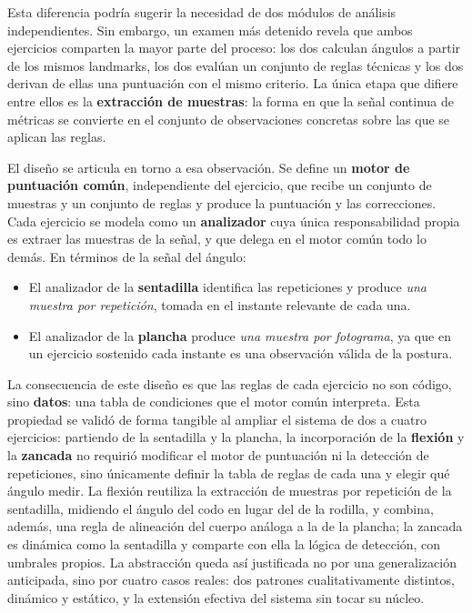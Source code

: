 \documentclass[12pt,a4paper,twoside,openright]{book}
\begin{document}
    Esta diferencia podría sugerir la necesidad de dos módulos de análisis
    independientes. Sin embargo, un examen más detenido revela que ambos
    ejercicios comparten la mayor parte del proceso: los dos calculan ángulos a
    partir de los mismos landmarks, los dos evalúan un conjunto de reglas
    técnicas y los dos derivan de ellas una puntuación con el mismo criterio. La
    única etapa que difiere entre ellos es la \textbf{extracción de muestras}: la
    forma en que la señal continua de métricas se convierte en el conjunto de
    observaciones concretas sobre las que se aplican las reglas.

    El diseño se articula en torno a esa observación. Se define un
    \textbf{motor de puntuación común}, independiente del ejercicio, que recibe
    un conjunto de muestras y un conjunto de reglas y produce la puntuación y las
    correcciones. Cada ejercicio se modela como un \textbf{analizador} cuya única
    responsabilidad propia es extraer las muestras de la señal, y que delega en
    el motor común todo lo demás. En términos de la señal del ángulo:

    \begin{itemize}
        \item El analizador de la \textbf{sentadilla} identifica las
        repeticiones y produce \textit{una muestra por repetición}, tomada en el
        instante relevante de cada una.
        \item El analizador de la \textbf{plancha} produce \textit{una muestra
        por fotograma}, ya que en un ejercicio sostenido cada instante es una
        observación válida de la postura.
    \end{itemize}

    La consecuencia de este diseño es que las reglas de cada ejercicio no son
    código, sino \textbf{datos}: una tabla de condiciones que el motor común
    interpreta. Esta propiedad se validó de forma tangible al ampliar el sistema
    de dos a cuatro ejercicios: partiendo de la sentadilla y la plancha, la
    incorporación de la \textbf{flexión} y la \textbf{zancada} no requirió
    modificar el motor de puntuación ni la detección de repeticiones, sino
    únicamente definir la tabla de reglas de cada una y elegir qué ángulo medir.
    La flexión reutiliza la extracción de muestras por repetición de la
    sentadilla, midiendo el ángulo del codo en lugar del de la rodilla, y
    combina, además, una regla de alineación del cuerpo análoga a la de la
    plancha; la zancada es dinámica como la sentadilla y comparte con ella la
    lógica de detección, con umbrales propios. La abstracción queda así
    justificada no por una generalización anticipada, sino por cuatro casos
    reales: dos patrones cualitativamente distintos, dinámico y estático, y
    la extensión efectiva del sistema sin tocar su núcleo.
\end{document}
